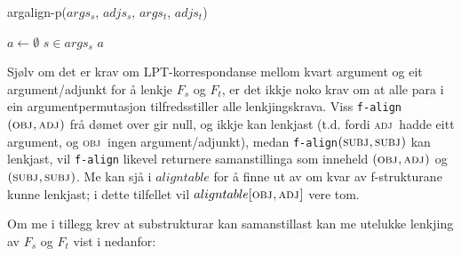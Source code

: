 \documentclass[11pt,a4paper,oneside,draft]{book}
\newcommand{\F}[2]{\textsc{#1}\ensuremath{_{#2}}}
\newcommand{\OBJ}{\F{obj}{}}
\newcommand{\OBJs}{\F{obj~}{}}
\newcommand{\ADJ}{\F{adj}{}}
\newcommand{\ADJs}{\F{adj~}{}}
\newcommand{\SUBJ}{\F{subj}{}}
\begin{document}
    
      \begin{algorithm}[]
      \caption{argalign-p($args_s$, $adjs_s$, $args_t$, $adjs_t$)}
      \label{algo:argalign-p}
    
      \BlankLine
      
     $a \gets \emptyset$\;
      {
           $s \in args_s$\;
            {
            }
            {
           }
             \Return $a$\;
         }
           {
          }
      \end{algorithm}

Sjølv om det er krav om LPT-korrespondanse mellom kvart argument og
eit argument/adjunkt for å lenkje $F_s$ og $F_t$, er det ikkje noko
krav om at alle para i ein argumentpermutasjon tilfredsstiller alle
lenkjingskrava. Viss \texttt{f-align}$(\OBJ,\ADJ)$ frå dømet over gir
null, og ikkje kan lenkjast (t.d. fordi \ADJs hadde eitt argument, og
\OBJs ingen argument/adjunkt), medan \texttt{f-align}$(\SUBJ,\SUBJ)$
kan lenkjast, vil \texttt{f-align} likevel returnere samanstillinga som
inneheld $(\OBJ,\ADJ)$ og $(\SUBJ,\SUBJ)$. Me kan sjå i $aligntable$
for å finne ut av om kvar av f-strukturane kunne lenkjast; i dette
tilfellet vil $aligntable[\OBJ,\ADJ]$ vere tom.


Om me i tillegg krev at substrukturar kan samanstillast kan me
utelukke lenkjing av $F_s$ og $F_t$ vist i \Next nedanfor:
\end{document}
